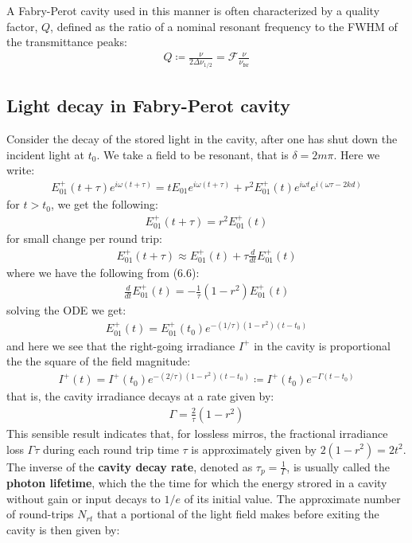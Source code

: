 \documentclass[11pt]{book}
\theoremstyle{break}
\theoremstyle{break}
\begin{document}
A Fabry-Perot cavity used in this manner is often characterized by a quality factor, $Q$, defined as the ratio of a nominal resonant frequency to the FWHM of the transmittance peaks:
\begin{align*}
Q \coloneqq \frac{\nu}{2\Delta\nu_{1/2}}=\mathcal{F} \frac{\nu}{\nu_{\text{fsr}}}
\end{align*}

\subsection{Light decay in Fabry-Perot cavity}
Consider the decay of the stored light in the cavity, after one has shut down the incident light at $t_0$. We take a field to be resonant, that is $\delta = 2m \pi$. Here we write:
\begin{align*}
E_{01}^+ (t+\tau) e^{i\omega(t+\tau)} = t E_{01}e^{i\omega(t+\tau)} + r^2 E_{01}^{+}(t)e^{i\omega t}e^{i(\omega\tau-2kd)}
\end{align*}
for $t>t_0$, we get the following:
\begin{align}
E_{01}^+ (t+\tau) =r^2 E_{01}^+(t)
\end{align}
for small change per round trip:
\begin{align*}
E_{01}^+ (t+\tau) \approx E_{01}^+(t) + \tau \frac{d}{dt}E_{01}^+(t)
\end{align*}
where we have the following from (6.6):
\begin{align*}
\frac{d}{dt}E_{01}^+(t)  = -\frac{1}{\tau}(1-r^2) E_{01}^+(t)
\end{align*}
solving the ODE we get:
\begin{align*}
E_{01}^+(t) = E_{01}^+(t_0)e^{-(1/\tau)(1-r^2) (t-t_0)}
\end{align*}
and here we see that the right-going irradiance $I^+$ in the cavity is proportional the the square of the field magnitude:
\begin{align*}
I^+(t) = I^+(t_0) e^{-(2/\tau)(1-r^2) (t-t_0)} \coloneqq I^+(t_0)e^{-\Gamma(t-t_0)}
\end{align*}
that is, the cavity irradiance decays at a rate given by:
\begin{align*}
\Gamma  = \frac{2}{\tau}(1-r^2)
\end{align*}
This sensible result indicates that, for lossless mirros, the fractional irradiance loss $\Gamma{\tau}$ during each round trip time $\tau$ is approximately given by $2(1-r^2) = 2t^2$. The inverse of the \textbf{cavity decay rate}, denoted as $\tau_p = \frac{1}{\Gamma}$, is usually called the \textbf{photon lifetime}, which the the time for which the energy strored in a cavity without gain or input decays to $1/e$ of its initial value. The approximate number of round-trips $N_{rt}$ that a portional of the light field makes before exiting the cavity is then given by:
\end{document}

